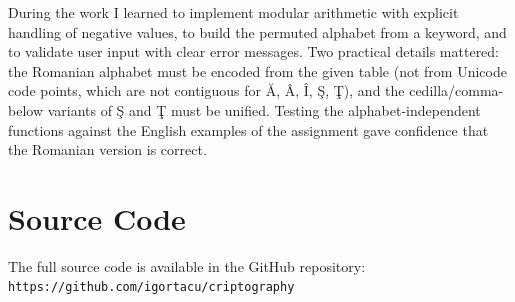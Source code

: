 \documentclass[12pt,a4paper]{article}
\begin{document}
During the work I learned to implement modular arithmetic with explicit handling
of negative values, to build the permuted alphabet from a keyword, and to
validate user input with clear error messages. Two practical details mattered: the
Romanian alphabet must be encoded from the given table (not from Unicode code
points, which are not contiguous for \u{A}, \^A, \^I, \c{S}, \c{T}), and the
cedilla/comma-below variants of \c{S} and \c{T} must be unified. Testing the
alphabet-independent functions against the English examples of the assignment gave
confidence that the Romanian version is correct.

\section{Source Code}

The full source code is available in the GitHub repository:\\
\texttt{https://github.com/igortacu/criptography}
\end{document}
